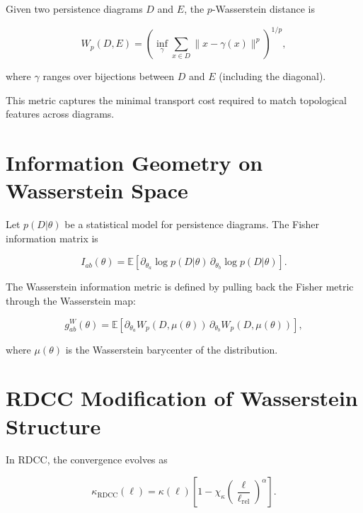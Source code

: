 \documentclass[11pt,a4paper]{article}
\begin{document}
Given two persistence diagrams $D$ and $E$, the $p$-Wasserstein distance is

\begin{equation}
    W_{p}(D,E)
    = \left(
        \inf_{\gamma}
        \sum_{x \in D}
        \| x - \gamma(x) \|^{p}
      \right)^{1/p},
\end{equation}

where $\gamma$ ranges over bijections between $D$ and $E$ (including the diagonal).

This metric captures the minimal transport cost required to match topological 
features across diagrams.
\section{Information Geometry on Wasserstein Space}

Let $p(D|\theta)$ be a statistical model for persistence diagrams. The Fisher 
information matrix is

\begin{equation}
    I_{ab}(\theta)
    = \mathbb{E}
      \left[
        \partial_{\theta_{a}} \log p(D|\theta)
        \,
        \partial_{\theta_{b}} \log p(D|\theta)
      \right].
\end{equation}

The Wasserstein information metric is defined by pulling back the Fisher metric 
through the Wasserstein map:

\begin{equation}
    g^{W}_{ab}(\theta)
    = \mathbb{E}
      \left[
        \partial_{\theta_{a}} W_{p}(D, \mu(\theta))
        \,
        \partial_{\theta_{b}} W_{p}(D, \mu(\theta))
      \right],
\end{equation}

where $\mu(\theta)$ is the Wasserstein barycenter of the distribution.
\section{RDCC Modification of Wasserstein Structure}

In RDCC, the convergence evolves as

\begin{equation}
    \kappa_{\mathrm{RDCC}}(\ell)
    = \kappa(\ell)
      \left[
        1 - \chi_{\kappa}
        \left(\frac{\ell}{\ell_{\mathrm{rel}}}\right)^{\alpha}
      \right].
\end{equation}
\end{document}
